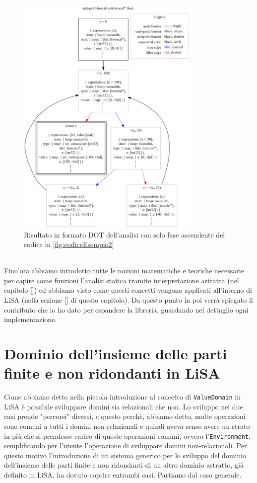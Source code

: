 \begin{figure}[ht]
	\centering
	\includegraphics[width=0.8\textwidth]{Immagini/graphviz.png}
	\caption{Risultato in formato DOT dell'analisi con solo fase ascendente del codice in \ref{fig:codiceEsempio2}}
	\label{fig:risultatoDOTAsc}
\end{figure}
\\

Fino'ora abbiamo introdotto tutte le nozioni matematiche e teoriche necessarie per capire come funzioni l'analisi statica tramite interpretazione astratta (nel capitolo []) ed abbiamo visto come questi concetti vengono applicati all'interno di LiSA (nella sezione [] di questo capitolo). Da questo punto in poi verrà spiegato il contributo che io ho dato per espandere la libreria, guardando nel dettaglio ogni implementazione. 

\section{Dominio dell'insieme delle parti finite e non ridondanti in LiSA}

Come abbiamo detto nella piccola introduzione al concetto di \texttt{ValueDomain} in LiSA è possibile sviluppare domini sia relazionali che non. Lo sviluppo nei due casi prende "percorsi" diversi, e questo perchè, abbiamo detto, molte operazioni sono comuni a tutti i domini non-relazionali e quindi aveva senso avere un strato in più che si prendesse carico di queste operazioni comuni, ovvero l'\texttt{Environment}, semplificando per l'utente l'operazione di sviluppare domini non-relazionali. Per questo motivo l'introduzione di un sistema generico per lo sviluppo del dominio dell'insieme delle parti finite e non ridondanti di un altro dominio astratto, già definito in LiSA, ha dovuto coprire entrambi casi. Partiamo dal caso generale. 

